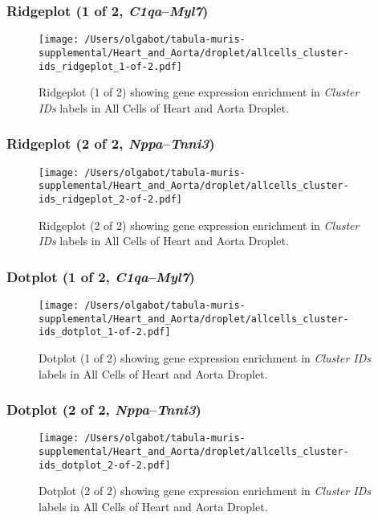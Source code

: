 \clearpage

\subsubsection{Ridgeplot (1 of 2, \emph{C1qa}--\emph{Myl7})}
\begin{figure}[h]
\centering
\texttt{[image: /Users/olgabot/tabula-muris-supplemental/Heart\_and\_Aorta/droplet/allcells\_cluster-ids\_ridgeplot\_1-of-2.pdf]}

\caption{ Ridgeplot (1 of 2)  showing gene expression enrichment in \emph{Cluster IDs} labels in All Cells of Heart and Aorta Droplet. }
\end{figure}


\clearpage

\subsubsection{Ridgeplot (2 of 2, \emph{Nppa}--\emph{Tnni3})}
\begin{figure}[h]
\centering
\texttt{[image: /Users/olgabot/tabula-muris-supplemental/Heart\_and\_Aorta/droplet/allcells\_cluster-ids\_ridgeplot\_2-of-2.pdf]}

\caption{ Ridgeplot (2 of 2)  showing gene expression enrichment in \emph{Cluster IDs} labels in All Cells of Heart and Aorta Droplet. }
\end{figure}


\clearpage

\subsubsection{Dotplot (1 of 2, \emph{C1qa}--\emph{Myl7})}
\begin{figure}[h]
\centering
\texttt{[image: /Users/olgabot/tabula-muris-supplemental/Heart\_and\_Aorta/droplet/allcells\_cluster-ids\_dotplot\_1-of-2.pdf]}

\caption{ Dotplot (1 of 2)  showing gene expression enrichment in \emph{Cluster IDs} labels in All Cells of Heart and Aorta Droplet. }
\end{figure}


\clearpage

\subsubsection{Dotplot (2 of 2, \emph{Nppa}--\emph{Tnni3})}
\begin{figure}[h]
\centering
\texttt{[image: /Users/olgabot/tabula-muris-supplemental/Heart\_and\_Aorta/droplet/allcells\_cluster-ids\_dotplot\_2-of-2.pdf]}

\caption{ Dotplot (2 of 2)  showing gene expression enrichment in \emph{Cluster IDs} labels in All Cells of Heart and Aorta Droplet. }
\end{figure}



